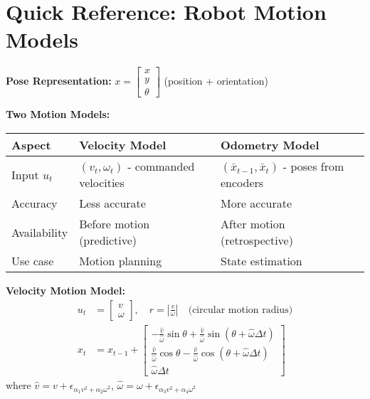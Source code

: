 
\section{Quick Reference: Robot Motion Models}

\begin{tcolorbox}[colback=yellow!10!white,colframe=orange!75!black,title=\textbf{Robot Motion Models - Fast Reference}]

\textbf{Pose Representation:} $x = \begin{bmatrix} x \\ y \\ \theta \end{bmatrix}$ (position + orientation)

\vspace{3mm}
\textbf{Two Motion Models:}

\begin{tabular}{|l|l|l|}
\hline
\textbf{Aspect} & \textbf{Velocity Model} & \textbf{Odometry Model} \\
\hline
Input $u_t$ & $(v_t, \omega_t)$ - commanded velocities & $(\bar{x}_{t-1}, \bar{x}_t)$ - poses from encoders \\
Accuracy & Less accurate & More accurate \\
Availability & Before motion (predictive) & After motion (retrospective) \\
Use case & Motion planning & State estimation \\
\hline
\end{tabular}

\vspace{3mm}
\textbf{Velocity Motion Model:}
\begin{align*}
u_t &= \begin{bmatrix} v \\ \omega \end{bmatrix}, \quad r = \left|\frac{v}{\omega}\right| \quad \text{(circular motion radius)} \\
x_t &= x_{t-1} + \begin{bmatrix}
-\frac{\hat{v}}{\hat{\omega}}\sin\theta + \frac{\hat{v}}{\hat{\omega}}\sin(\theta + \hat{\omega}\Delta t) \\
\frac{\hat{v}}{\hat{\omega}}\cos\theta - \frac{\hat{v}}{\hat{\omega}}\cos(\theta + \hat{\omega}\Delta t) \\
\hat{\omega}\Delta t
\end{bmatrix}
\end{align*}
where $\hat{v} = v + \epsilon_{\alpha_1 v^2 + \alpha_2 \omega^2}$, $\hat{\omega} = \omega + \epsilon_{\alpha_3 v^2 + \alpha_4 \omega^2}$


\end{tcolorbox}
